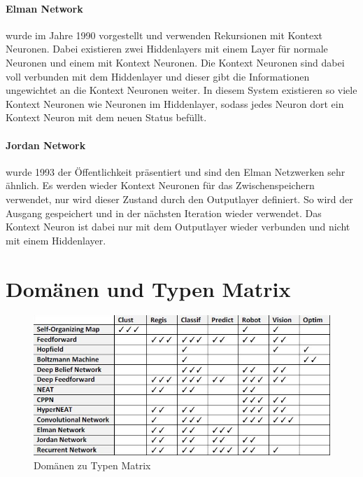 \paragraph{Elman Network} wurde im Jahre 1990 vorgestellt und verwenden Rekursionen mit Kontext Neuronen. 
Dabei existieren zwei Hiddenlayers mit einem Layer für normale Neuronen und einem mit Kontext Neuronen. 
Die Kontext Neuronen sind dabei voll verbunden mit dem Hiddenlayer und dieser gibt die Informationen ungewichtet an die Kontext Neuronen weiter.
In diesem System existieren so viele Kontext Neuronen wie Neuronen im Hiddenlayer, sodass jedes Neuron dort ein Kontext Neuron mit dem neuen Status befüllt.

\paragraph{Jordan Network} wurde 1993 der Öffentlichkeit präsentiert und sind den Elman Netzwerken sehr ähnlich. 
Es werden wieder Kontext Neuronen für das Zwischenspeichern verwendet, nur wird dieser Zustand durch den Outputlayer definiert.
So wird der Ausgang gespeichert und in der nächsten Iteration wieder verwendet.
Das Kontext Neuron ist dabei nur mit dem Outputlayer wieder verbunden und nicht mit einem Hiddenlayer.

\section{Domänen und Typen Matrix}

\begin{figure}
	\includegraphics[scale=0.68]{images/typen_domains.png}
	\caption{Domänen zu Typen Matrix \cite{AI3}}
	\label{fig:DomainMatrix}
\end{figure}

